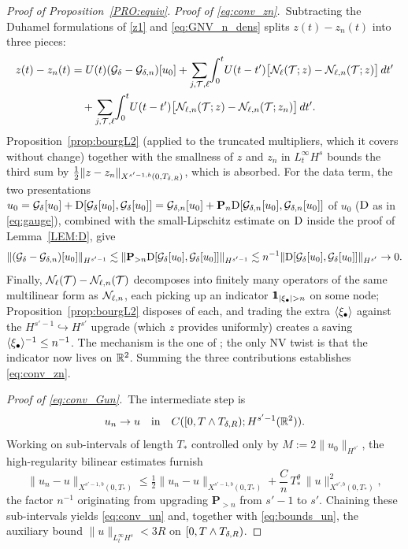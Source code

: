 \begin{proof}[Proof of Proposition~\textup{\ref{PRO:equiv}}]
\smallskip
\noindent\emph{Proof of \eqref{eq:conv_zn}.}\
Subtracting the Duhamel formulations of \eqref{z1} and
\eqref{eq:GNV_n_dens} splits $z(t)-z_n(t)$ into three pieces:
\begin{align*}
z(t)-z_n(t)
&= U(t)(\mathcal{G}_\delta-\mathcal{G}_{\delta,n})[u_0]
+ \sum_{j,\mathcal{T},\ell}\!\int_0^t\! U(t-t')
\big[\mathcal{N}_\ell(\mathcal{T};z)-\mathcal{N}_{\ell,n}(\mathcal{T};z)\big]\,dt'
\\
&\quad
+ \sum_{j,\mathcal{T},\ell}\!\int_0^t\! U(t-t')
\big[\mathcal{N}_{\ell,n}(\mathcal{T};z)-\mathcal{N}_{\ell,n}(\mathcal{T};z_n)\big]\,dt'.
\end{align*}
Proposition~\ref{prop:bourgL2} (applied to the truncated multipliers,
which it covers without change) together with the smallness of $z$
and $z_n$ in $L^\infty_t H^s$ bounds the third sum by
$\tfrac12\|z-z_n\|_{X^{s'-1,b}(0,T_{\delta,R})}$, which is absorbed.
For the data term, the two presentations
$u_0=\mathcal{G}_\delta[u_0]+\mathrm{D}[\mathcal{G}_\delta[u_0],\mathcal{G}_\delta[u_0]]
=\mathcal{G}_{\delta,n}[u_0]+\mathbf{P}_n\mathrm{D}[\mathcal{G}_{\delta,n}[u_0],\mathcal{G}_{\delta,n}[u_0]]$
of $u_0$ ($\mathrm{D}$ as in \eqref{eq:gauge}), combined with the
small-Lipschitz estimate on $\mathrm{D}$ inside the proof of
Lemma~\ref{LEM:D}, give
\[
\|(\mathcal{G}_\delta-\mathcal{G}_{\delta,n})[u_0]\|_{H^{s'-1}}
\lesssim \|\mathbf{P}_{>n}\mathrm{D}[\mathcal{G}_\delta[u_0],\mathcal{G}_\delta[u_0]]\|_{H^{s'-1}}
\lesssim n^{-1}\|\mathrm{D}[\mathcal{G}_\delta[u_0],\mathcal{G}_\delta[u_0]]\|_{H^{s'}}
\to 0.
\]
Finally, $\mathcal{N}_\ell(\mathcal{T})-\mathcal{N}_{\ell,n}(\mathcal{T})$ decomposes into finitely
many operators of the same multilinear form as $\mathcal{N}_{\ell,n}$,
each picking up an indicator $\ind_{|\xi_\bul|>n}$ on some node;
Proposition~\ref{prop:bourgL2} disposes of each, and trading the
extra $\langle \xi_\bullet \rangle$ against the $H^{s'-1}\hookrightarrow H^{s'}$
upgrade (which $z$ provides uniformly) creates a saving
$\langle \xi_\bullet \rangle^{-1}\le n^{-1}$. The mechanism is the one of
\cite{chcora}; the only NV twist is that the indicator now lives on
$\mathbb{R}^2$. Summing the three contributions establishes
\eqref{eq:conv_zn}.

\smallskip
\noindent\emph{Proof of \eqref{eq:conv_Gun}.}\
The intermediate step is
\begin{equation}\label{eq:conv_un}
u_n \to u \quad\text{in}\quad C([0,T\wedge T_{\delta,R}); H^{s'-1}(\mathbb{R}^2)).
\end{equation}
Working on sub-intervals of length $T_*$ controlled only by
$M:=2\|u_0\|_{H^{s'}}$, the high-regularity bilinear estimates
\cite{angelopolous,kazeykinamunoz1,kazeykinamunoz2} furnish
\[
\|u_n-u\|_{X^{s'-1,b}(0,T_*)}
\le \tfrac12\|u_n-u\|_{X^{s'-1,b}(0,T_*)}
+ \frac{C}{n}\,T_*^\theta\,\|u\|_{X^{s',b}(0,T_*)}^2,
\]
the factor $n^{-1}$ originating from upgrading $\mathbf{P}_{>n}$ from
$s'-1$ to $s'$. Chaining these sub-intervals yields
\eqref{eq:conv_un} and, together with \eqref{eq:bounds_un}, the
auxiliary bound $\|u\|_{L^\infty_t H^s}<3R$ on
$[0,T\wedge T_{\delta,R})$.


\end{proof}
